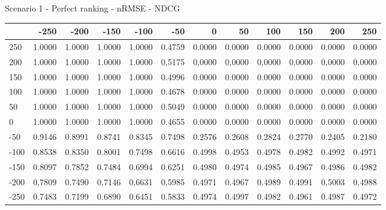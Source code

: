 Scenario 1 - Perfect ranking - nRMSE - NDCG
\begin{tabular}{lrrrrrrrrrrr}
\toprule
{} &   -250 &   -200 &   -150 &   -100 &   -50  &    0   &    50  &    100 &    150 &    200 &    250 \\
\midrule
 250 & 1.0000 & 1.0000 & 1.0000 & 1.0000 & 0.4759 & 0.0000 & 0.0000 & 0.0000 & 0.0000 & 0.0000 & 0.0000 \\
 200 & 1.0000 & 1.0000 & 1.0000 & 1.0000 & 0.5175 & 0.0000 & 0.0000 & 0.0000 & 0.0000 & 0.0000 & 0.0000 \\
 150 & 1.0000 & 1.0000 & 1.0000 & 1.0000 & 0.4996 & 0.0000 & 0.0000 & 0.0000 & 0.0000 & 0.0000 & 0.0000 \\
 100 & 1.0000 & 1.0000 & 1.0000 & 1.0000 & 0.4678 & 0.0000 & 0.0000 & 0.0000 & 0.0000 & 0.0000 & 0.0000 \\
 50  & 1.0000 & 1.0000 & 1.0000 & 1.0000 & 0.5049 & 0.0000 & 0.0000 & 0.0000 & 0.0000 & 0.0000 & 0.0000 \\
 0   & 1.0000 & 1.0000 & 1.0000 & 1.0000 & 0.4655 & 0.0000 & 0.0000 & 0.0000 & 0.0000 & 0.0000 & 0.0000 \\
-50  & 0.9146 & 0.8991 & 0.8741 & 0.8345 & 0.7498 & 0.2576 & 0.2608 & 0.2824 & 0.2770 & 0.2405 & 0.2180 \\
-100 & 0.8538 & 0.8350 & 0.8001 & 0.7498 & 0.6616 & 0.4998 & 0.4953 & 0.4978 & 0.4982 & 0.4992 & 0.4971 \\
-150 & 0.8097 & 0.7852 & 0.7484 & 0.6994 & 0.6251 & 0.4980 & 0.4974 & 0.4985 & 0.4967 & 0.4986 & 0.4982 \\
-200 & 0.7809 & 0.7490 & 0.7146 & 0.6631 & 0.5985 & 0.4971 & 0.4967 & 0.4989 & 0.4991 & 0.5003 & 0.4988 \\
-250 & 0.7483 & 0.7199 & 0.6890 & 0.6451 & 0.5833 & 0.4974 & 0.4997 & 0.4982 & 0.4961 & 0.4987 & 0.4972 \\
\bottomrule
\end{tabular}

